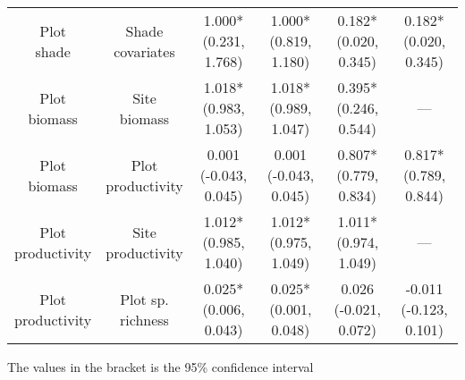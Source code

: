 \documentclass{article}
\begin{document}
\begin{adjustwidth}{-1cm}{}
\begin{tabular}{ c c c c c c }
    \makecell{Plot \\ shade} & \makecell{Shade \\ covariates} & \makecell{1.000* \\ (0.231, 1.768)}
    & \makecell{1.000* \\ (0.819, 1.180)} & \makecell{0.182* \\ (0.020, 0.345)} 
    & \makecell{0.182* \\ (0.020, 0.345)} \\
    
    \makecell{Plot \\ biomass} & \makecell{Site \\ biomass} & \makecell{1.018* \\ (0.983, 1.053)}
    & \makecell{1.018* \\ (0.989, 1.047)} & \makecell{0.395* \\ (0.246, 0.544)}
    & --- \\
    
    \makecell{Plot \\ biomass} & \makecell{Plot \\ productivity} & \makecell{0.001 \\ (-0.043, 0.045)}
    & \makecell{0.001 \\ (-0.043, 0.045)} & \makecell{0.807* \\ (0.779, 0.834)}
    & \makecell{0.817* \\ (0.789, 0.844)}\\
    
    \makecell{Plot \\ productivity} & \makecell{Site \\ productivity} & \makecell{1.012* \\ (0.985, 1.040)}
    & \makecell{1.012* \\ (0.975, 1.049)} & \makecell{1.011* \\ (0.974, 1.049)}
    & --- \\
    
    \makecell{Plot \\ productivity} & \makecell{Plot sp. \\ richness} & \makecell{0.025* \\ (0.006, 0.043)}
    & \makecell{0.025* \\ (0.001, 0.048)} & \makecell{0.026 \\ (-0.021, 0.072)}
    & \makecell{-0.011 \\ (-0.123, 0.101)} \\
 
    \hline
\end{tabular}
\caption{The values in the bracket is the 95\% confidence interval}
\end{adjustwidth}
\end{document}
